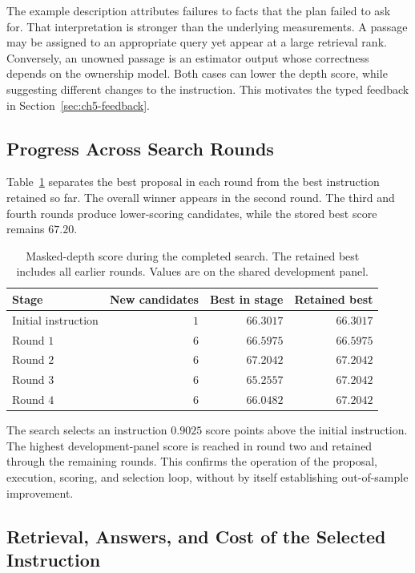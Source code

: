 The example description attributes failures to facts that the plan failed to
ask for. That interpretation is stronger than the underlying measurements.
A passage may be assigned to an appropriate query yet appear at a large
retrieval rank. Conversely, an unowned passage is an estimator output whose
correctness depends on the ownership model. Both cases can lower the depth
score, while suggesting different changes to the instruction. This motivates
the typed feedback in Section~\ref{sec:ch5-feedback}.

\subsection{Progress Across Search Rounds}

Table~\ref{tab:ch5-rounds} separates the best proposal in each round from the
best instruction retained so far. The overall winner appears in the second
round. The third and fourth rounds produce lower-scoring candidates, while
the stored best score remains $67.20$.

\begin{table}[H]
\centering
\caption{Masked-depth score during the completed search. The retained best
includes all earlier rounds. Values are on the shared development panel.}
\label{tab:ch5-rounds}
\begin{tabular}{lrrr}
\hline
Stage & New candidates & Best in stage & Retained best \\
\hline
Initial instruction & $1$ & $66.3017$ & $66.3017$ \\
Round $1$ & $6$ & $66.5975$ & $66.5975$ \\
Round $2$ & $6$ & $67.2042$ & $67.2042$ \\
Round $3$ & $6$ & $65.2557$ & $67.2042$ \\
Round $4$ & $6$ & $66.0482$ & $67.2042$ \\
\hline
\end{tabular}
\end{table}

The search selects an instruction $0.9025$ score points above the initial
instruction. The highest development-panel score is reached in round two and 
retained through the remaining rounds. This confirms the operation of the proposal, 
execution, scoring, and selection loop, without by itself establishing out-of-sample improvement.

\subsection{Retrieval, Answers, and Cost of the Selected Instruction}

